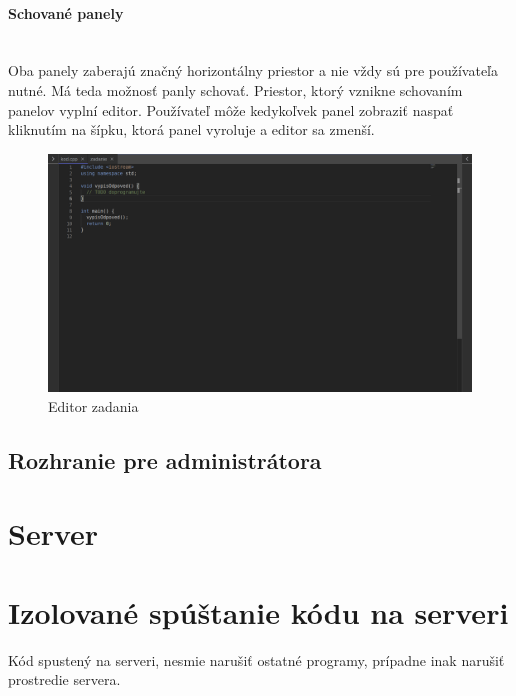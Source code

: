 \paragraph{Schované panely}\leavevmode\\
Oba panely zaberajú značný horizontálny priestor a nie vždy sú pre používateľa nutné. Má teda
možnosť panly schovať. Priestor, ktorý vznikne schovaním panelov vyplní editor. Používateľ môže
kedykoľvek panel zobraziť naspať kliknutím na šípku, ktorá panel vyroluje a editor sa zmenší. 
\begin{figure}[H]
\centerline{\includegraphics[width=1\textwidth]{images/zcucnute_panely}}
\caption[Editor zadania]{Editor zadania}
\label{obr:zcucnute_panely}
\end{figure}

\subsection{Rozhranie pre administrátora}

\section{Server}

\section{Izolované spúštanie kódu na serveri}
\label{kap:isolated_env} %

Kód spustený na serveri, nesmie narušiť ostatné programy, prípadne inak narušiť prostredie servera.
